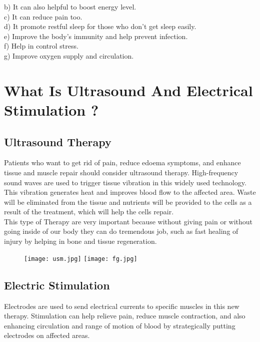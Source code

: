 \documentclass[12pt]{article}
\begin{document}
b) It can also helpful to boost energy level.\\

c) It can reduce pain too.\\ 

d) It promote restful sleep for those who don't get sleep  easily.\\

e) Improve the body's immunity and help prevent   infection.\\

f) Help in control stress.\\

g) Improve oxygen supply and circulation.

\clearpage


\section{What Is Ultrasound And Electrical Stimulation ?}

\subsection{Ultrasound Therapy}
Patients who want to get rid of pain, reduce edoema symptoms, and enhance tissue and muscle repair should consider ultrasound therapy. High-frequency sound waves are used to trigger tissue vibration in this widely used technology. This vibration generates heat and improves blood flow to the affected area. Waste will be eliminated from the tissue and nutrients will be provided to the cells as a result of the treatment, which will help the cells repair.\\

This type of Therapy are very important because without giving pain or without going inside of our body they can do tremendous job, such as fast healing of injury by helping in bone and tissue regeneration.

\begin{figure}[h]
\centering
\texttt{[image: usm.jpg]}
\texttt{[image: fg.jpg]}
\end{figure}

\clearpage
\subsection{Electric Stimulation}
Electrodes are used to send electrical currents to specific muscles in this new therapy. Stimulation can help relieve pain, reduce muscle contraction, and  also enhancing circulation and range of motion of blood by strategically putting electrodes on affected areas.
\end{document}
